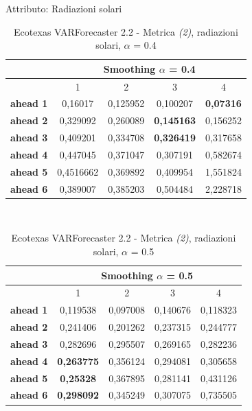 \documentclass[12pt,a4paper,oneside,openright]{book}
\begin{document}
\newpage

Attributo: Radiazioni solari \\ 

\begin{table}[H]
\centering
\begin{tabular}{|c|c|c|c|c|}
\hline
 & \multicolumn{4}{|c|}{Smoothing $\alpha$ = 0.4} \\
\hline
& 1 & 2 & 3 & 4 \\
\hline
\textbf{ahead 1} & 0,16017 & 0,125952 & 0,100207 & \textbf{0,07316}\\
\hline
\textbf{ahead 2} & 0,329092 & 0,260089 & \textbf{0,145163} & 0,156252\\ 
\hline
\textbf{ahead 3} & 0,409201 & 0,334708 & \textbf{0,326419} & 0,317658\\
\hline
\textbf{ahead 4} & 0,447045 & 0,371047 & 0,307191 & 0,582674\\ 
\hline
\textbf{ahead 5} & 0,4516662 & 0,369892 & 0,409954 & 1,551824\\
\hline
\textbf{ahead 6} & 0,389007 & 0,385203 & 0,504484 & 2,228718\\ 
\hline
\end{tabular} \\
\caption{Ecotexas VARForecaster 2.2 - Metrica \textit{(2)}, radiazioni solari, $\alpha$ = 0.4}
\end{table}

\medskip

\begin{table}[H]
\centering
\begin{tabular}{|c|c|c|c|c|}
\hline
 & \multicolumn{4}{|c|}{Smoothing $\alpha$ = 0.5} \\
\hline
& 1 & 2 & 3 & 4 \\
\hline
\textbf{ahead 1} & 0,119538 & 0,097008 & 0,140676 & 0,118323\\
\hline
\textbf{ahead 2} & 0,241406 & 0,201262 & 0,237315 & 0,244777\\ 
\hline
\textbf{ahead 3} & 0,282696 & 0,295507 & 0,269165 & 0,282236\\
\hline
\textbf{ahead 4} & \textbf{0,263775} & 0,356124 & 0,294081 & 0,305658\\ 
\hline
\textbf{ahead 5} & \textbf{0,25328} & 0,367895 & 0,281141 & 0,431126\\
\hline
\textbf{ahead 6} & \textbf{0,298092} & 0,345249 & 0,307075 & 0,735505\\ 
\hline
\end{tabular} \\
\caption{Ecotexas VARForecaster 2.2 - Metrica \textit{(2)}, radiazioni solari, $\alpha$ = 0.5}
\end{table}
\end{document}
